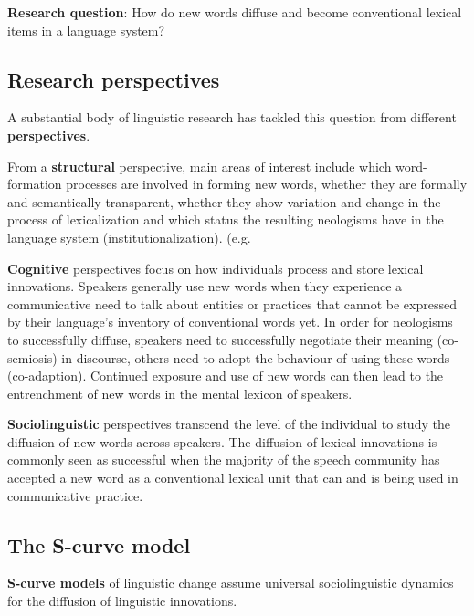 \documentclass[
  a4paper,
  ]{scrartcl}
\renewcommand{\hw}[1]{\textbf{#1}}
\begin{document}
    \hw{Research question}: How do new words diffuse and become conventional lexical items in a language system?

  \subsection{Research perspectives}

    A substantial body of linguistic research has tackled this question from different \hw{perspectives}. \parencite[16]{Schmid2016}

    From a \hw{structural} perspective, main areas of interest include which word-formation processes are involved in forming new words, whether they are formally and semantically transparent, whether they show variation and change in the process of lexicalization and which status the resulting neologisms have in the language system (institutionalization). (e.g. \cite{Bauer1983,Lipka2005}

    \hw{Cognitive} perspectives focus on how individuals process and store lexical innovations. Speakers generally use new words when they experience a communicative need to talk about entities or practices that cannot be expressed by their language's inventory of conventional words yet. In order for neologisms to successfully diffuse, speakers need to successfully negotiate their meaning (co-semiosis) in discourse, others need to adopt the behaviour of using these words (co-adaption). Continued exposure and use of new words can then lead to the entrenchment of new words in the mental lexicon of speakers. \parencite{Schmid2008}

    \hw{Sociolinguistic} perspectives transcend the level of the individual to study the diffusion of new words across speakers. The diffusion of lexical innovations is commonly seen as successful when the majority of the speech community has accepted a new word as a conventional lexical unit that can and is being used in communicative practice.

  \subsection{The S-curve model}

    \hw{S-curve models} of linguistic change \parencite{Labov2007,Milroy1992,Nevalainen2015} assume universal sociolinguistic dynamics for the diffusion of linguistic innovations.
\end{document}

